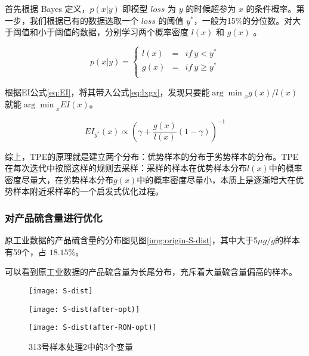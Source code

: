 \documentclass[bwprint]{gmcmthesis}
\begin{document}
首先根据 Bayes 定义，$p(x|y)$ 即模型 $loss$ 为 $y$ 的时候超参为 $x$ 的条件概率。第一步，我们根据已有的数据选取一个 $loss$ 的阈值 $y^*$，一般为15\%的分位数。对大于阈值和小于阈值的数据，分别学习两个概率密度 $l(x)$ 和 $g(x)$ 。

\begin{equation}\label{eq:lxgx}
	p(x|y)=\left\{
	\begin{aligned}
		l(x) & = & if \ y<y^* \\
		g(x) & = & if \ y\ge y^* \\
	\end{aligned}
	\right.
\end{equation}

根据EI公式\eqref{eq:EI}，将其带入公式\eqref{eq:lxgx}，发现只要能${\arg\min}_x{g(x)/l(x)}$就能${\arg\min}_x{EI(x)}$。

\begin{equation}\label{EIlxgx}
	EI_{y^*}(x) \propto (\gamma+\frac{g(x)}{l(x)}(1 - \gamma))^{-1}
\end{equation}

综上，TPE的原理就是建立两个分布：优势样本的分布于劣势样本的分布。TPE在每次迭代中按照这样的规则去采样：采样的样本在优势样本分布$l(x)$中的概率密度尽量大，在劣势样本分布$g(x)$中的概率密度尽量小，本质上是逐渐增大在优势样本附近采样率的一个启发式优化过程。




\FloatBarrier
\subsubsection{对产品硫含量进行优化}


原工业数据的产品硫含量的分布图见图\ref{img:origin-S-dist}，其中大于5$\mu g/g$的样本有59个，占 $18.15\%$。

可以看到原工业数据的产品硫含量为长尾分布，充斥着大量硫含量偏高的样本。


\begin{figure}[htb]
	\centering
	\begin{minipage}[c]{0.4\textwidth}
		\centering
		\texttt{[image: S-dist]}
		\label{img:origin-S-dist}
	\end{minipage}
	\begin{minipage}[c]{0.4\textwidth}
		\centering
		\texttt{[image: S-dist(after-opt)]}
		\label{img:single-S-dist}
	\end{minipage}
	\begin{minipage}[c]{0.4\textwidth}
		\centering
		\texttt{[image: S-dist(after-RON-opt)]}
		\label{img:joint-S-dist}
	\end{minipage}
	\caption{313号样本处理2中的3个变量}
\end{figure}
\end{document}
